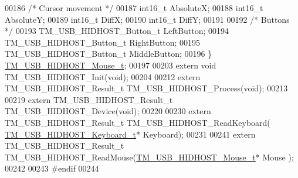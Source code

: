 \begin{DoxyCode}
00186     \textcolor{comment}{/* Cursor movement */}
00187     int16\_t AbsoluteX;
00188     int16\_t AbsoluteY;
00189     int16\_t DiffX;
00190     int16\_t DiffY;
00191     
00192     \textcolor{comment}{/* Buttons */}
00193     TM\_USB\_HIDHOST\_Button\_t LeftButton;
00194     TM\_USB\_HIDHOST\_Button\_t RightButton;
00195     TM\_USB\_HIDHOST\_Button\_t MiddleButton;
00196 \} \hyperlink{struct_t_m___u_s_b___h_i_d_h_o_s_t___mouse__t}{TM\_USB\_HIDHOST\_Mouse\_t};
00197 
00203 \textcolor{keyword}{extern} \textcolor{keywordtype}{void} TM\_USB\_HIDHOST\_Init(\textcolor{keywordtype}{void});
00204 
00212 \textcolor{keyword}{extern} TM\_USB\_HIDHOST\_Result\_t TM\_USB\_HIDHOST\_Process(\textcolor{keywordtype}{void});
00213 
00219 \textcolor{keyword}{extern} TM\_USB\_HIDHOST\_Result\_t TM\_USB\_HIDHOST\_Device(\textcolor{keywordtype}{void});
00220 
00230 \textcolor{keyword}{extern} TM\_USB\_HIDHOST\_Result\_t TM\_USB\_HIDHOST\_ReadKeyboard(
      \hyperlink{struct_t_m___u_s_b___h_i_d_h_o_s_t___keyboard__t}{TM\_USB\_HIDHOST\_Keyboard\_t}* Keyboard);
00231 
00241 \textcolor{keyword}{extern} TM\_USB\_HIDHOST\_Result\_t TM\_USB\_HIDHOST\_ReadMouse(\hyperlink{struct_t_m___u_s_b___h_i_d_h_o_s_t___mouse__t}{TM\_USB\_HIDHOST\_Mouse\_t}* Mouse
      );
00242 
00243 \textcolor{preprocessor}{#endif}
00244 
\end{DoxyCode}
